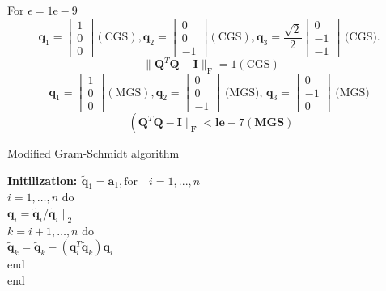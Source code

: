 \documentclass[english,onecolumn]{IEEEtran}
\begin{document}
\begin{enumerate}
 For $ \epsilon=1 \mathrm{e}-9$
$$
\mathbf{q}_{1}=\left[\begin{array}{l}
	1 \\
	0 \\
	0
\end{array}\right](\mathrm{CGS}), \mathbf{q}_{2}=\left[\begin{array}{l}
	0 \\
	0 \\
	-1
\end{array}\right](\mathrm{CGS}), \mathbf{q}_{3}=\frac{\sqrt{2}}{2}\left[\begin{array}{c}
	0 \\
	-1 \\
	-1
\end{array}\right] \text { (CGS). }
$$
$$
\|\mathbf{Q}^{T} \mathbf{Q}-\mathbf{I} \|_{\mathrm{F}}=1(\mathrm{CGS})
$$
$$
\mathbf{q}_{1}=\left[\begin{array}{l}
	1 \\
	0 \\
	0
\end{array}\right](\mathrm{MGS}), \mathbf{q}_{2}=\left[\begin{array}{c}
	0 \\
	0 \\
	-1
\end{array}\right] \text { (MGS), } \mathbf{q}_{3}=\left[\begin{array}{c}
	0 \\
	-1 \\
	0
\end{array}\right] \text { (MGS) }
$$
$$
\left(\mathbf{Q}^{T} \mathbf{Q}-\mathbf{I} \|_{\mathbf{F}}<\mathbf{l e}-7(\mathbf{M G S})\right.
$$
	\begin{algorithm}[!hbp]
	\label{alg:modified_gs}
	\caption{Modified Gram-Schmidt algorithm}
	\SetAlgoLined
	\textbf{Initilization: $\tilde{\mathbf{q}}_{1}=\mathbf{a}_{1}, \text{for} \quad  i = 1,...,n$}\\
	 $i=1, \ldots, n$ do\\
	\quad $\mathbf{q}_{i}=\tilde{\mathbf{q}}_{i} / \tilde{\mathbf{q}}_{i} \|_{2}$ \\
	\quad	\quad	{} $k=i+1, \ldots, n$ do\\
    \quad   \quad \quad	$\tilde{\mathbf{q}}_{k}=\tilde{\mathbf{q}}_{k}-\left(\mathbf{q}_{i}^{T} \tilde{\mathbf{q}}_{k}\right) \mathbf{q}_{i}$\\
\quad \quad		end \\
			end\\
	
	
\end{algorithm}
\end{enumerate} 
\end{document}
